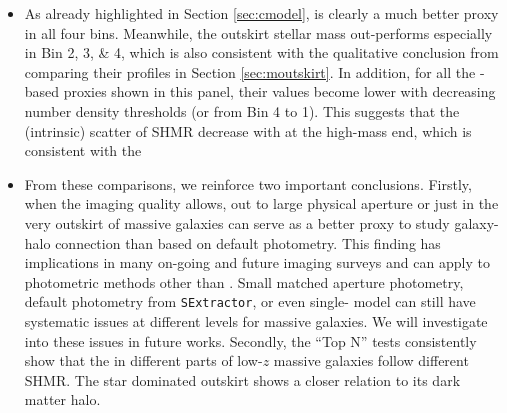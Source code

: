 \documentclass[a4paper,fleqn,usenatbib]{mnras}
\begin{document}
\begin{itemize}
        \item As already highlighted in Section \ref{sec:cmodel},  is clearly a much better 
            \mvir{} proxy in all four bins. Meanwhile, the outskirt stellar mass 
            out-performs  especially in Bin 2, 3, \& 4, which is also consistent with the 
            qualitative conclusion from comparing their \dsigma{} profiles in Section \ref{sec:moutskirt}.
            In addition, for all the \mstar{}-based \mvir{} proxies shown in this panel, their \sighalo{}
            values become lower with decreasing number density thresholds (or from Bin 4 to 1).
            This suggests that the (intrinsic) scatter of SHMR decrease with \mvir{} at the high-mass end,
            which is consistent with the 
        
        \item From these comparisons, we reinforce two important conclusions.
            Firstly, when the imaging quality allows, \mstar{} out to large physical aperture or
            just in the very outskirt of massive galaxies can serve as a better \mvir{} proxy to
            study galaxy-halo connection than \mstar{} based on default photometry.
            This finding has implications in many on-going and future imaging surveys and can apply 
            to photometric methods other than \cmodel{}. 
            Small matched aperture photometry, default photometry from \texttt{SExtractor}, or even 
            single-\ser{} model can still have systematic issues at different levels for massive
            galaxies. We will investigate into these issues in future works.
            Secondly, the ``Top N'' tests consistently show that the \mstar{} in different parts of 
            low-$z$ massive galaxies follow different SHMR. 
            The \exsitu{} star dominated outskirt shows a closer relation to its dark matter halo.
        

\end{itemize}
\end{document}
